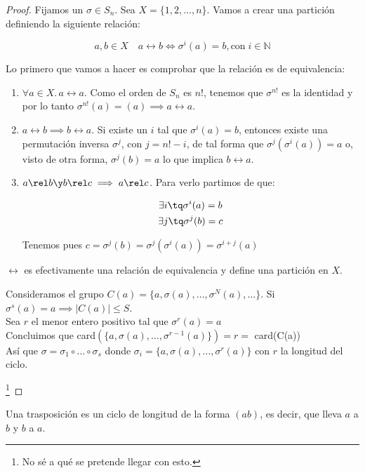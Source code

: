 \documentclass[nochap]{apuntes}
\begin{document}
\begin{proof}
Fijamos un $\sigma \in S_n$. Sea $X = \{ 1,2,\dotsc ,n\} $. Vamos a crear una partición definiendo la siguiente relación:

\[ a,b \in X\quad a\rel b \iff \sigma^i(a) = b, \text{con}\; i\in \mathbb{N} \]

Lo primero que vamos a hacer es comprobar que la relación es de equivalencia:

\begin{enumerate}
\item $\forall a \in X.\, a\rel a$. Como el orden de $S_n$ es $n!$, tenemos que $\sigma^{n!}$ es la identidad y por lo tanto $\sigma^{n!}(a) = (a) \implies a\rel a$.

\item $a\rel b \implies b\rel a$. Si existe un $i$ tal que $\sigma ^i (a) = b$, entonces existe una permutación inversa $σ^j$, con $j=n! - i$, de tal forma que $σ^j(σ^i(a)) = a$ o, visto de otra forma, $σ^j(b) = a$ lo que implica $b\rel a$.

\item $a\rel b \y b\rel c \implies a\rel c$. Para verlo partimos de que:

\begin{gather*}
\exists i \tq \sigma ^i (a) = b \\
\exists j \tq \sigma ^j (b) = c
\end{gather*}

Tenemos pues $c=\sigma^j(b)=\sigma^j(\sigma ^i(a))=\sigma^{i+j}(a)$

\end{enumerate}

$\rel$ es efectivamente una relación de equivalencia y define una partición en $X$.

Consideramos el grupo $C(a) = \{ a, \sigma (a), \dotsc , \sigma ^N(a), \dotsc \}$.
Si $\sigma ^s (a)=a \implies |C(a)| \leq S$.\\
Sea $r$ el menor entero positivo tal que $\sigma^r(a)=a$\\
Concluimos que card$(\{ a, \sigma (a), \hdots , \sigma ^{r-1}(a)\}) = r =$ card(C(a))\\
Así que $\sigma = \sigma _1 \circ \hdots \circ \sigma _s$
donde $\sigma _i = \{ a, \sigma (a), \hdots , \sigma ^r(a)\} $ con $r$ la longitud del ciclo.

\footnote{No sé a qué se pretende llegar con esto.}
\end{proof}

\begin{defn}[Trasposición] Una trasposición es un ciclo de longitud de la forma $(ab)$, es decir, que lleva $a$ a $b$ y $b$ a $a$.
\end{defn}
\end{document}
